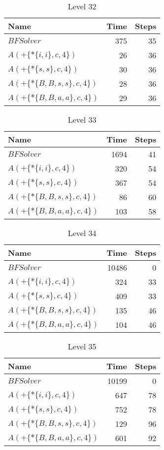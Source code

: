 \begin{table} \centering \begin{tabular}{lrr}\toprule \textbf{ Name }
    & \textbf{ Time } & \textbf{ Steps }\\\midrule
    $BFSolver$ & 375 & 35 \\
    $A(+\{*\{i,i\},c,4\})$ & 26 & 36 \\
    $A(+\{*\{s,s\},c,4\})$ & 30 & 36 \\
    $A(+\{*\{B,B,s,s\},c,4\})$ & 28 & 36 \\
    $A(+\{*\{B,B,a,a\},c,4\})$ & 29 & 36 \\
    \bottomrule \end{tabular} \caption{Level 32}
  \label{tab:level_32} \end{table}

\begin{table} \centering \begin{tabular}{lrr}\toprule \textbf{ Name }
    & \textbf{ Time } & \textbf{ Steps }\\\midrule
    $BFSolver$ & 1694 & 41 \\
    $A(+\{*\{i,i\},c,4\})$ & 320 & 54 \\
    $A(+\{*\{s,s\},c,4\})$ & 367 & 54 \\
    $A(+\{*\{B,B,s,s\},c,4\})$ & 86 & 60 \\
    $A(+\{*\{B,B,a,a\},c,4\})$ & 103 & 58 \\
    \bottomrule \end{tabular} \caption{Level 33}
  \label{tab:level_33} \end{table}

\begin{table} \centering \begin{tabular}{lrr}\toprule \textbf{ Name }
    & \textbf{ Time } & \textbf{ Steps }\\\midrule
    $BFSolver$ & 10486 & 0 \\
    $A(+\{*\{i,i\},c,4\})$ & 324 & 33 \\
    $A(+\{*\{s,s\},c,4\})$ & 409 & 33 \\
    $A(+\{*\{B,B,s,s\},c,4\})$ & 135 & 46 \\
    $A(+\{*\{B,B,a,a\},c,4\})$ & 104 & 46 \\
    \bottomrule \end{tabular} \caption{Level 34}
  \label{tab:level_34} \end{table}

\begin{table} \centering \begin{tabular}{lrr}\toprule \textbf{ Name }
    & \textbf{ Time } & \textbf{ Steps }\\\midrule
    $BFSolver$ & 10199 & 0 \\
    $A(+\{*\{i,i\},c,4\})$ & 647 & 78 \\
    $A(+\{*\{s,s\},c,4\})$ & 752 & 78 \\
    $A(+\{*\{B,B,s,s\},c,4\})$ & 129 & 96 \\
    $A(+\{*\{B,B,a,a\},c,4\})$ & 601 & 92 \\
    \bottomrule \end{tabular} \caption{Level 35}
  \label{tab:level_35} \end{table}

